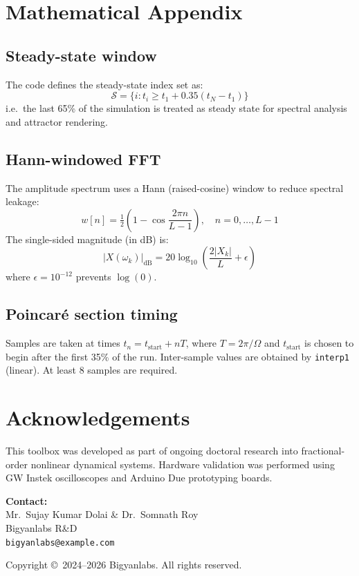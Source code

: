 \documentclass[12pt,a4paper]{article}
\begin{document}
\section{Mathematical Appendix}

\subsection{Steady-state window}

The code defines the steady-state index set as:
\[
  \mathcal{S} = \bigl\{i : t_i \geq t_1 + 0.35(t_N - t_1)\bigr\}
\]
i.e.\ the last 65\% of the simulation is treated as steady state for spectral analysis and attractor rendering.

\subsection{Hann-windowed FFT}

The amplitude spectrum uses a Hann (raised-cosine) window to reduce spectral leakage:
\[
  w[n] = \tfrac{1}{2}\!\left(1 - \cos\!\frac{2\pi n}{L-1}\right), \quad n=0,\ldots,L-1
\]
The single-sided magnitude (in dB) is:
\[
  |X(\omega_k)|_\text{dB} = 20\log_{10}\!\left(\frac{2|X_k|}{L} + \epsilon\right)
\]
where $\epsilon = 10^{-12}$ prevents $\log(0)$.

\subsection{Poincar\'e section timing}

Samples are taken at times $t_n = t_\text{start} + nT$, where $T = 2\pi/\Omega$ and $t_\text{start}$ is chosen to begin after the first 35\% of the run.  Inter-sample values are obtained by \texttt{interp1} (linear).  At least 8 samples are required.

\section*{Acknowledgements}

This toolbox was developed as part of ongoing doctoral research into fractional-order nonlinear dynamical systems.  Hardware validation was performed using GW Instek oscilloscopes and Arduino Due prototyping boards.

\vspace{1em}
\noindent\textbf{Contact:}\\
Mr.\ Sujay Kumar Dolai \& Dr.\ Somnath Roy\\
Bigyanlabs R\&D\\
\texttt{bigyanlabs@example.com}

\vspace{1em}
\noindent Copyright \copyright\ 2024--2026 Bigyanlabs.  All rights reserved.
\end{document}
